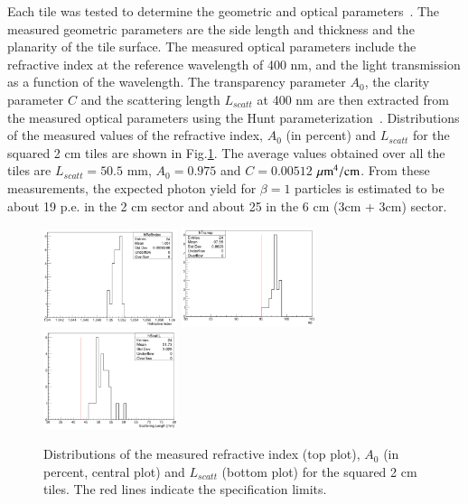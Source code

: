\documentclass[5p,times,twocolumn]{elsarticle}
\begin{document}
Each tile was tested to determine the geometric and optical parameters~\cite{RICH:RICH2016mc}.
The measured geometric parameters are the side length and thickness and the planarity of the tile surface.
The measured optical parameters include the refractive index at the reference wavelength of 400 nm, and the light transmission as a function of the wavelength. The transparency parameter $A_0$, the clarity parameter $C$ and the scattering length $L_{scatt}$ at 400 nm are then extracted from the measured optical parameters using the Hunt parameterization~\cite{Hunt}.
Distributions of the measured values of the refractive index, $A_0$ (in percent) and $L_{scatt}$ for the squared 2 cm tiles are shown in Fig.\ref{Fig:Aerogel_2cm}.
The average values obtained over all the tiles are $L_{scatt} = 50.5$ mm, $A_0 = 0.975$ and $C = 0.00512$ $\rm \mu m^4 / cm$.
From these measurements, the expected photon yield for $\beta=1$ particles is estimated to be about 19 p.e. in the 2 cm sector and about 25 in the 6 cm (3cm + 3cm) sector.

\begin{figure}
\begin{center}
\includegraphics[width=0.35\textwidth]{AeroRefInd_2cm.pdf}
\includegraphics[width=0.35\textwidth]{AeroA0_2cm.pdf}
\includegraphics[width=0.35\textwidth]{AeroLscatt_2cm.pdf}
\caption{Distributions of the measured refractive index (top plot), $A_0$ (in percent, central plot) and $L_{scatt}$ (bottom plot) for the squared 2 cm tiles. The red lines indicate the specification limits.}
\label{Fig:Aerogel_2cm}
\end{center}
\end{figure}
\end{document}
